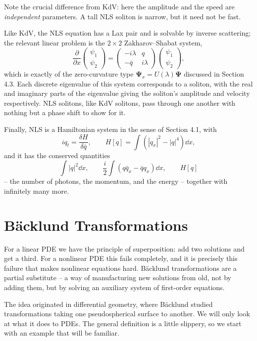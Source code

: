 Note the crucial difference from KdV: here the amplitude and the speed are \emph{independent} parameters. A tall NLS soliton is narrow, but it need not be fast.

Like KdV, the NLS equation has a Lax pair and is solvable by inverse scattering; the relevant linear problem is the $2\times2$ Zakharov--Shabat system,
$$
\frac{\partial}{\partial x}\begin{pmatrix}\psi_1\\\psi_2\end{pmatrix} = \begin{pmatrix}-i\lambda & q\\ -\bar q & i\lambda\end{pmatrix}\begin{pmatrix}\psi_1\\\psi_2\end{pmatrix},
$$
which is exactly of the zero-curvature type $\bm\Psi_x = U(\lambda)\bm\Psi$ discussed in Section 4.3. Each discrete eigenvalue of this system corresponds to a soliton, with the real and imaginary parts of the eigenvalue giving the soliton's amplitude and velocity respectively. NLS solitons, like KdV solitons, pass through one another with nothing but a phase shift to show for it.

Finally, NLS is a Hamiltonian system in the sense of Section 4.1, with
$$
iq_t = \frac{\delta H}{\delta\bar q}, \qquad H[q] = \int\left(|q_x|^2 - |q|^4\right)\dd x,
$$
and it has the conserved quantities
$$
\int|q|^2\dd x, \qquad \frac{i}{2}\int\left(q\bar q_x - \bar q q_x\right)\dd x, \qquad H[q]
$$
-- the number of photons, the momentum, and the energy -- together with infinitely many more.

\section{B\"acklund Transformations}

For a linear PDE we have the principle of superposition: add two solutions and get a third. For a nonlinear PDE this fails completely, and it is precisely this failure that makes nonlinear equations hard. B\"acklund transformations are a partial substitute -- a way of manufacturing new solutions from old, not by adding them, but by solving an auxiliary system of first-order equations.

The idea originated in differential geometry, where B\"acklund studied transformations taking one pseudospherical surface to another. We will only look at what it does to PDEs. The general definition is a little slippery, so we start with an example that will be familiar.

